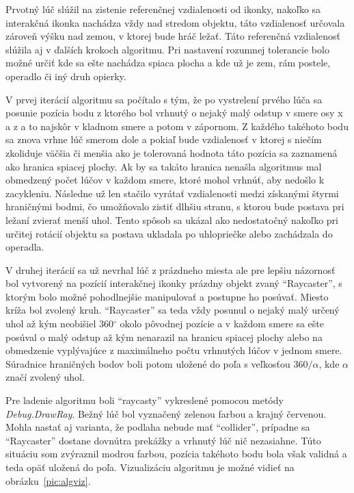 \documentclass[slovak, bachelorpractice]{diploma}
\begin{document}
Prvotný lúč slúžil na zistenie referenčnej vzdialenosti od ikonky, nakoľko sa interakčná ikonka nachádza vždy nad stredom objektu, táto vzdialenosť určovala zároveň výšku nad zemou, v ktorej bude hráč ležať. Táto referenčná vzdialenosť slúžila aj v ďalších krokoch algoritmu. Pri nastavení rozumnej tolerancie bolo možné určiť kde sa ešte nachádza spiaca plocha a kde už je zem, rám postele, operadlo či iný druh opierky. 

V prvej iterácií algoritmu sa počítalo s tým, že po vystrelení prvého lúča sa posunie pozícia bodu z ktorého bol vrhnutý o nejaký malý odstup v smere osy x a z a to najskôr v kladnom smere a potom v zápornom. Z každého takéhoto bodu sa znova vrhne lúč smerom dole a pokiaľ bude vzdialenosť v ktorej s niečím zkoliduje väčšia či menšia ako je tolerovaná hodnota táto pozícia sa zaznamená ako hranica spiacej plochy. Ak by sa takáto hranica nenašla algoritmus mal obmedzený počet lúčov v každom smere, ktoré mohol vrhnúť, aby nedošlo k zacykleniu. Následne už len stačilo vyrátať vzdialenosti medzi získanými štyrmi hraničnými bodmi, čo umožňovalo zistiť dlhšiu stranu, s ktorou bude postava pri ležaní zvierať menší uhol. Tento spôsob sa ukázal ako nedostatočný nakoľko pri určitej rotácií objektu sa postava ukladala po uhlopriečke alebo zachádzala do operadla.

V druhej iterácií sa už nevrhal lúč z prázdneho miesta ale pre lepšiu názornosť bol vytvorený na pozícií interakčnej ikonky prázdny objekt zvaný \enquote{Raycaster}, s ktorým bolo možné pohodlnejšie manipulovať a postupne ho posúvať. Miesto kríža bol zvolený kruh. \enquote{Raycaster} sa teda vždy posunul o nejaký malý určený uhol až kým neobišiel 360$^{\circ}$ okolo pôvodnej pozície a v každom smere sa ešte posúval o malý odstup až kým nenarazil na hranicu spiacej plochy alebo na obmedzenie vyplývajúce z maximálneho počtu vrhnutých lúčov v jednom smere. Súradnice hraničných bodov boli potom uložené do poľa s veľkosťou $360/\alpha$, kde $\alpha$ značí zvolený uhol. 

Pre ladenie algoritmu boli \enquote{raycasty} vykreslené pomocou metódy \textit{Debug.DrawRay}. Bežný lúč bol vyznačený zelenou farbou a krajný červenou. Mohla nastať aj varianta, že podlaha nebude mať \enquote{collider}, prípadne sa \enquote{Raycaster} dostane dovnútra prekážky a vrhnutý lúč nič nezasiahne. Túto situáciu som zvýraznil modrou farbou, pozícia takéhoto bodu bola však validná a teda opäť uložená do poľa. Vizualizáciu algoritmu je možné vidieť na \mbox{obrázku \ref{pic:algviz}}.
\end{document}
